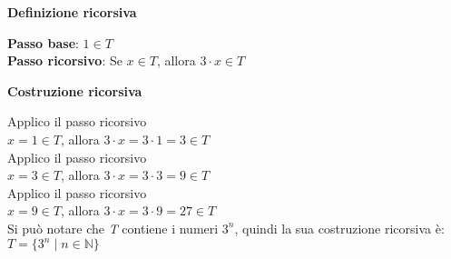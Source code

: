 \begin{example}
\phantom{}
\centerline{\textbf{Definizione ricorsiva}}
\textbf{Passo base}: $1 \in T$ \\
\textbf{Passo ricorsivo}: Se $x \in T$, allora $3 \cdot x \in T$ \\
\centerline{\textbf{Costruzione ricorsiva}}
Applico il passo ricorsivo \\
$x = 1 \in T$, allora $3 \cdot x = 3 \cdot 1 = 3 \in T$ \\
Applico il passo ricorsivo \\
$x = 3 \in T$, allora $3 \cdot x = 3 \cdot 3 = 9 \in T$ \\
Applico il passo ricorsivo \\
$x = 9 \in T$, allora $3 \cdot x = 3 \cdot 9 = 27 \in T$ \\

Si può notare che \textit{T} contiene i numeri $3^n$, quindi la sua costruzione ricorsiva è: $T = \{3^n \mid n \in \mathbb{N}\}$
\end{example}
